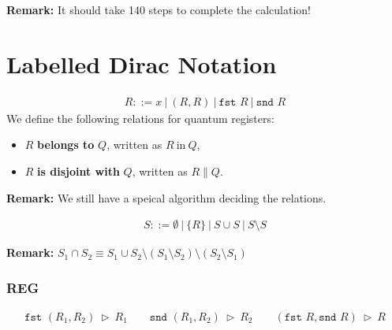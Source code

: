 \documentclass[manuscript, review, timestamp]{acmart}
\newcommand*{\fst}{\texttt{fst }}
\newcommand*{\snd}{\texttt{snd }}
\newcommand*{\reduce}{\ \triangleright\ }
\begin{document}
\textbf{Remark:} It should take 140 steps to complete the calculation!




\section{Labelled Dirac Notation}

\begin{definition}
  \begin{align*}
    R ::= x\ |\ (R, R)\ |\ \fst R\ |\ \snd R
  \end{align*}
  We define the following relations for quantum registers:
  \begin{itemize}
    \item $R$ \textbf{belongs to} $Q$, written as $R\ \text{in}\ Q$,
    \item $R$ \textbf{is disjoint with} $Q$, written as $R \| Q$.
  \end{itemize}
\end{definition}

\textbf{Remark:} We still have a speical algorithm deciding the relations.

\begin{definition}
  \begin{align*}
    S ::= \emptyset\ |\ \{ R \} \ |\ S \cup S\ |\ S \setminus S
  \end{align*}
\end{definition}

\textbf{Remark: } $ S_1 \cap S_2 \equiv S_1 \cup S_2 \setminus (S_1 \setminus S_2) \setminus (S_2 \setminus S_1) $

\subsubsection*{\textsf{REG}}
\begin{gather*}
  \fst (R_1, R_2) \reduce R_1 \qquad 
  \snd (R_1, R_2) \reduce R_2 \qquad
  (\fst R, \snd R) \reduce R
\end{gather*}
\end{document}
